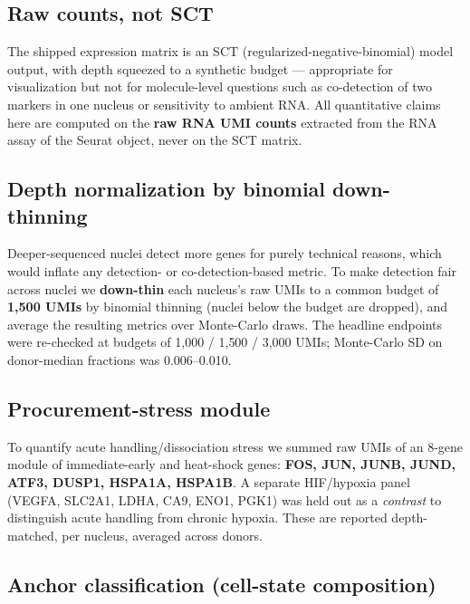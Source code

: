 \documentclass[11pt,a4paper]{article}
\begin{document}
\subsection{Raw counts, not SCT}

The shipped expression matrix is an SCT (regularized-negative-binomial) model output, with depth squeezed to a synthetic budget --- appropriate for visualization but not for molecule-level questions such as co-detection of two markers in one nucleus or sensitivity to ambient RNA. All quantitative claims here are computed on the \textbf{raw RNA UMI counts} extracted from the RNA assay of the Seurat object, never on the SCT matrix.

\subsection{Depth normalization by binomial down-thinning}

Deeper-sequenced nuclei detect more genes for purely technical reasons, which would inflate any detection- or co-detection-based metric. To make detection fair across nuclei we \textbf{down-thin} each nucleus's raw UMIs to a common budget of \textbf{1{,}500 UMIs} by binomial thinning (nuclei below the budget are dropped), and average the resulting metrics over Monte-Carlo draws. The headline endpoints were re-checked at budgets of 1{,}000 / 1{,}500 / 3{,}000 UMIs; Monte-Carlo SD on donor-median fractions was 0.006--0.010.

\subsection{Procurement-stress module}

To quantify acute handling/dissociation stress we summed raw UMIs of an 8-gene module of immediate-early and heat-shock genes: \textbf{FOS, JUN, JUNB, JUND, ATF3, DUSP1, HSPA1A, HSPA1B}. A separate HIF/hypoxia panel (VEGFA, SLC2A1, LDHA, CA9, ENO1, PGK1) was held out as a \emph{contrast} to distinguish acute handling from chronic hypoxia. These are reported depth-matched, per nucleus, averaged across donors.

\subsection{Anchor classification (cell-state composition)}
\end{document}

